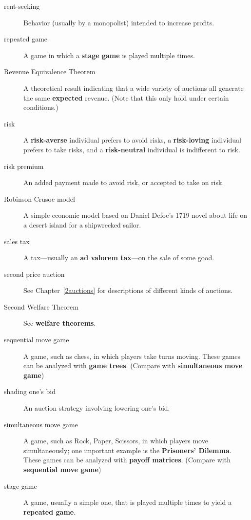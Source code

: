 \begin{description}
\item[rent-seeking] Behavior (usually by a monopolist) intended to increase profits.

\item[repeated game] A game in which a \textbf{stage game} is played multiple times.

\item[Revenue Equivalence Theorem] A theoretical result indicating that a wide variety of auctions all generate the same \textbf{expected} revenue. (Note that this only hold under certain conditions.)

\item[risk] A \textbf{risk-averse} individual prefers to avoid risks, a \textbf{risk-loving} individual prefers to take risks, and a \textbf{risk-neutral} individual is indifferent to risk.  

\item[risk premium] An added payment made to avoid risk, or accepted to take on risk.

\item[Robinson Crusoe model] A simple economic model based on Daniel Defoe's 1719 novel about life on a desert island for a shipwrecked sailor.  

\item[sales tax] A tax---usually an \textbf{ad valorem tax}---on the sale of some good.

\item[second price auction] See Chapter~\ref{2auctions} for descriptions of different kinds of auctions.

\item[Second Welfare Theorem] See \textbf{welfare theorems}. 

\item[sequential move game] A game, such as chess, in which players take turns moving. These games can be analyzed with \textbf{game trees}. (Compare with \textbf{simultaneous move game})

\item[shading one's bid] An auction strategy involving lowering one's bid.

\item[simultaneous move game] A game, such as Rock, Paper, Scissors, in which players move simultaneously; one important example is the \textbf{Prisoners' Dilemma}. These games can be analyzed with \textbf{payoff matrices}. (Compare with \textbf{sequential move game})

\item[stage game] A game, usually a simple one, that is played multiple times to yield a \textbf{repeated game}. 


\end{description}

